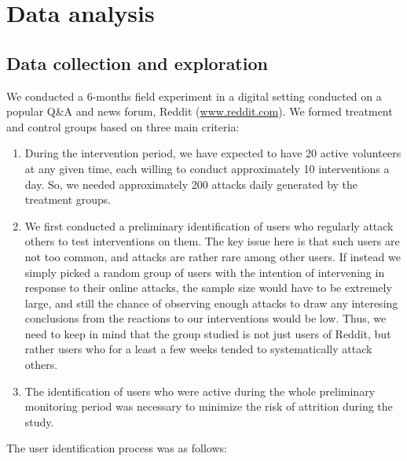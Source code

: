 \documentclass[preprint,12pt]{elsarticle}
\begin{document}
\section{Data analysis}\label{sec{analysis}}

\subsection{Data collection and exploration}\label{subsec:data-and-exploration}









We conducted a 6-months field experiment in a digital setting conducted on a popular Q\&A and news forum, Reddit (\url{www.reddit.com}). We formed treatment and control groups based on three main criteria:

\renewcommand{\labelenumii}{\Roman{enumii}}
 \begin{enumerate}
 \item During the intervention period, we have expected to have 20 active volunteers at any given time, each willing to conduct approximately 10 interventions a day.  So, we needed approximately 200 attacks daily generated by the treatment groups.
\item We first conducted a preliminary identification of users who regularly attack others to test interventions on them. The key issue here is that such users are not too common, and attacks are rather rare among other users. If instead we simply picked a random group of users with the intention of intervening in response to their online attacks, the sample size would have to be extremely large, and still the chance of observing enough attacks to draw any interesing conclusions from the reactions to our interventions would be low. Thus, we need to keep in mind that the group studied is not just users of Reddit, but rather users who for a least a few weeks tended to systematically attack others.

\item The identification of users who were active during the whole preliminary monitoring period was necessary to minimize the risk of attrition during the study. 
 \end{enumerate}

\noindent The user identification process was as follows:
\end{document}
